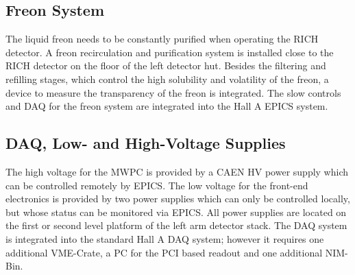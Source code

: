 {\subsection{Freon System}
The liquid freon needs to be constantly purified when operating the RICH detector.
A freon recirculation and purification system is installed close to the RICH detector 
on the floor of the left detector hut. Besides the filtering and refilling stages,
which control the high solubility and volatility of the freon, a device to measure
the transparency of the freon is integrated. The slow controls and DAQ for the freon
system are integrated into the Hall A EPICS system.

\subsection{DAQ, Low- and High-Voltage Supplies}
The high voltage for the MWPC is provided by a CAEN HV power supply which can
be controlled remotely by EPICS. The low voltage for the front-end electronics 
is provided by two power supplies which can only be controlled locally, but
whose status can be monitored via EPICS.
All power supplies are located on the first or second level platform of the 
left arm detector stack. The DAQ system is integrated into the standard Hall A 
DAQ system; however it requires one additional VME-Crate, a PC for the PCI based readout and one additional 
NIM-Bin.
}

